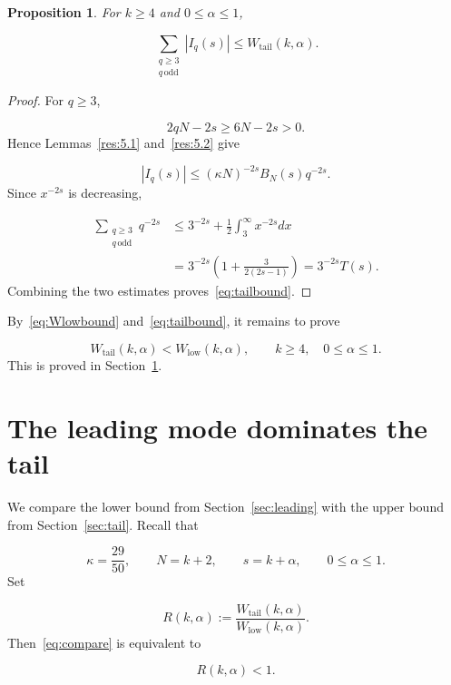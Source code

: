 \documentclass[11pt]{article}
\theoremstyle{plain}
\newtheorem{proposition}[theorem]{Proposition}
\theoremstyle{definition}
\theoremstyle{remark}
\begin{document}
\begin{proposition}\label{res:5.3}
For $k \ge 4$ and $0 \le \alpha \le 1$,

\begin{equation}\label{eq:tailbound}
  \sum_{\substack{q \ge 3 \\ q \,\mathrm{odd}}} |I_q(s)| \le W_{\mathrm{tail}}(k,\alpha ) .
\end{equation}
\end{proposition}

\begin{proof}
For $q \ge 3$,

\[
  2qN - 2s \ge 6N - 2s > 0 .
\]
Hence Lemmas~\ref{res:5.1} and~\ref{res:5.2} give

\[
  |I_q(s)| \le (\kappa N)^{-2s} B_N(s) q^{-2s} .
\]
Since $x^{-2s}$ is decreasing,

\begin{align*}
  \sum_{\substack{q \ge 3 \\ q \,\mathrm{odd}}} q^{-2s} &\le 3^{-2s} + \frac{1}{2}\int_{3}^{\infty } x^{-2s} dx \\
  &= 3^{-2s}\left( 1 + \frac{3}{2(2s-1)} \right) = 3^{-2s} T(s) .
\end{align*}
Combining the two estimates proves~\eqref{eq:tailbound}.
\end{proof}

By~\eqref{eq:Wlowbound} and~\eqref{eq:tailbound}, it remains to prove

\begin{equation}\label{eq:compare}
  W_{\mathrm{tail}}(k,\alpha ) < W_{\mathrm{low}}(k,\alpha ) , \qquad  k \ge 4, \quad  0 \le \alpha \le 1 .
\end{equation}
This is proved in Section~\ref{sec:dominate}.


\section{The leading mode dominates the tail}\label{sec:dominate}

We compare the lower bound from Section~\ref{sec:leading} with the upper bound from Section~\ref{sec:tail}. Recall that

\[
  \kappa = \frac{29}{50} , \qquad  N = k+2 , \qquad  s = k+\alpha , \qquad  0 \le \alpha \le 1 .
\]
Set

\[
  R(k,\alpha ) := \frac{W_{\mathrm{tail}}(k,\alpha )}{W_{\mathrm{low}}(k,\alpha )} .
\]
Then~\eqref{eq:compare} is equivalent to

\[
  R(k,\alpha ) < 1 .
\]
\end{document}
